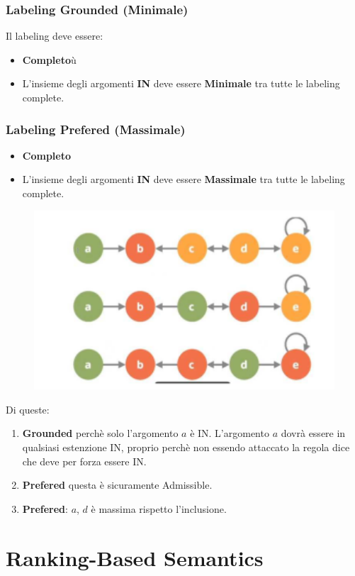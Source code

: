 \subsection{Labeling Grounded (Minimale)}
Il labeling deve essere:
\begin{itemize}
    \item \textbf{Completo}ù
    \item L’insieme degli argomenti \textbf{IN} deve essere \textbf{Minimale} tra tutte le labeling complete.
\end{itemize}
\subsection{Labeling Prefered (Massimale)}
\begin{itemize}
    \item \textbf{Completo}
    \item L’insieme degli argomenti \textbf{IN} deve essere \textbf{Massimale} tra tutte le labeling complete.
\end{itemize}
\begin{figure}[htp]
	\centering
    \includegraphics[width=12cm, keepaspectratio]{img/Cap7/GR.png}
\end{figure}
Di queste:
\begin{enumerate}
    \item \textbf{Grounded} perchè solo l’argomento $a$ è IN. L’argomento $a$ dovrà essere in qualsiasi estenzione IN, proprio perchè non essendo attaccato la regola dice che deve per forza essere IN.
    \item \textbf{Prefered} questa è sicuramente Admissible.
    \item \textbf{Prefered}: $a$, $d$ è massima rispetto l’inclusione.
\end{enumerate}


\chapter{Ranking-Based Semantics} \label{Ranking-Based Semantics}
